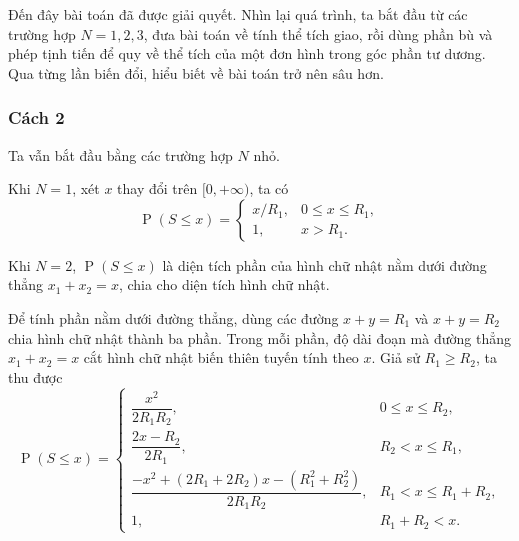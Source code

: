 \documentclass[11pt]{article}
\newcommand{\Prob}{\operatorname{P}}
\begin{document}
Đến đây bài toán đã được giải quyết. Nhìn lại quá trình, ta bắt đầu từ các
trường hợp \(N=1,2,3\), đưa bài toán về tính thể tích giao, rồi dùng phần bù
và phép tịnh tiến để quy về thể tích của một đơn hình trong góc phần tư dương.
Qua từng lần biến đổi, hiểu biết về bài toán trở nên sâu hơn.

\subsubsection{Cách 2}

Ta vẫn bắt đầu bằng các trường hợp \(N\) nhỏ.

Khi \(N=1\), xét \(x\) thay đổi trên \([0,+\infty)\), ta có
\[
  \Prob(S\le x)=
  \begin{cases}
    x/R_1, & 0\le x\le R_1,\\
    1, & x>R_1.
  \end{cases}
\]

Khi \(N=2\), \(\Prob(S\le x)\) là diện tích phần của hình chữ nhật nằm dưới
đường thẳng \(x_1+x_2=x\), chia cho diện tích hình chữ nhật.

\begin{center}
\end{center}

Để tính phần nằm dưới đường thẳng, dùng các đường \(x+y=R_1\) và \(x+y=R_2\)
chia hình chữ nhật thành ba phần. Trong mỗi phần, độ dài đoạn mà đường thẳng
\(x_1+x_2=x\) cắt hình chữ nhật biến thiên tuyến tính theo \(x\). Giả sử
\(R_1\ge R_2\), ta thu được
\[
  \Prob(S\le x)=
  \begin{cases}
    \dfrac{x^2}{2R_1R_2}, & 0\le x\le R_2,\\[0.8em]
    \dfrac{2x-R_2}{2R_1}, & R_2<x\le R_1,\\[0.8em]
    \dfrac{-x^2+(2R_1+2R_2)x-(R_1^2+R_2^2)}{2R_1R_2},
      & R_1<x\le R_1+R_2,\\[0.8em]
    1, & R_1+R_2<x.
  \end{cases}
\]
\end{document}
